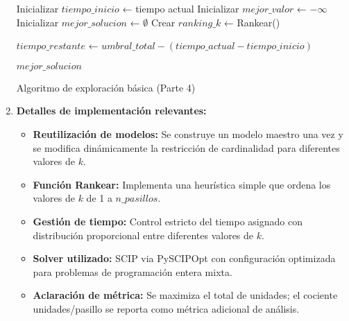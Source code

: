 \documentclass[a4paper,12pt]{article}
\begin{document}
\begin{enumerate}[label=(\alph*), leftmargin=2em]
\begin{algorithm}[H]
    Inicializar $tiempo\_inicio$ ← tiempo actual\;
    Inicializar $mejor\_valor$ ← $-\infty$\;
    Inicializar $mejor\_solucion$ ← $\emptyset$\;
    Crear $ranking\_k$ ← Rankear() 
    
    
    $tiempo\_restante$ ← $umbral\_total - (tiempo\_actual - tiempo\_inicio)$\;
    
    
    \Return $mejor\_solucion$\;
    
    \caption{Algoritmo de exploración básica (Parte 4)}
    \end{algorithm}

    \item \textbf{Detalles de implementación relevantes:}
    
    \begin{itemize}
        \item \textbf{Reutilización de modelos:} Se construye un modelo maestro una vez y se modifica dinámicamente la restricción de cardinalidad para diferentes valores de $k$.
        \item \textbf{Función Rankear:} Implementa una heurística simple que ordena los valores de $k$ de 1 a $n\_pasillos$.
        \item \textbf{Gestión de tiempo:} Control estricto del tiempo asignado con distribución proporcional entre diferentes valores de $k$.
        \item \textbf{Solver utilizado:} SCIP via PySCIPOpt con configuración optimizada para problemas de programación entera mixta.
    \item \textbf{Aclaración de métrica:} Se maximiza el total de unidades; el cociente unidades/pasillo se reporta como métrica adicional de análisis.
    \end{itemize}

\end{enumerate}
\end{document}
